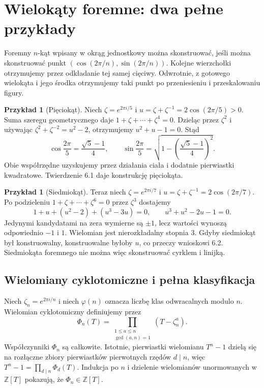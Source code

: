 \documentclass[11pt,a4paper,oneside]{book}
\numberwithin{equation}{section}
\theoremstyle{plain}
\theoremstyle{definition}
\newtheorem{przyklad}[twierdzenie]{Przykład}
\theoremstyle{remark}
\newcommand{\Z}{\mathbb{Z}}
\begin{document}
\section{Wielokąty foremne: dwa pełne przykłady}

Foremny $n$-kąt wpisany w okrąg jednostkowy można skonstruować, jeśli można skonstruować punkt $(\cos(2\pi/n),\sin(2\pi/n))$. Kolejne wierzchołki otrzymujemy przez odkładanie tej samej cięciwy. Odwrotnie, z gotowego wielokąta i jego środka otrzymujemy taki punkt po przeniesieniu i przeskalowaniu figury.

\begin{przyklad}[Pięciokąt]
Niech $\zeta=e^{2\pi i/5}$ i $u=\zeta+\zeta^{-1}=2\cos(2\pi/5)>0$. Suma szeregu geometrycznego daje $1+\zeta+\cdots+\zeta^4=0$. Dzieląc przez $\zeta^2$ i używając $\zeta^2+\zeta^{-2}=u^2-2$, otrzymujemy $u^2+u-1=0$. Stąd
\[
\cos\frac{2\pi}{5}=\frac{\sqrt5-1}{4},\qquad
\sin\frac{2\pi}{5}=\sqrt{1-\left(\frac{\sqrt5-1}{4}\right)^2}.
\]
Obie współrzędne uzyskujemy przez działania ciała i dodatnie pierwiastki kwadratowe. Twierdzenie 6.1 daje konstrukcję pięciokąta.
\end{przyklad}

\begin{przyklad}[Siedmiokąt]
Teraz niech $\zeta=e^{2\pi i/7}$ i $u=\zeta+\zeta^{-1}=2\cos(2\pi/7)$. Po podzieleniu $1+\zeta+\cdots+\zeta^6=0$ przez $\zeta^3$ dostajemy
\[
1+u+(u^2-2)+(u^3-3u)=0,\qquad u^3+u^2-2u-1=0.
\]
Jedynymi kandydatami na zera wymierne są $\pm1$, lecz wartości wynoszą odpowiednio $-1$ i $1$. Wielomian jest nierozkładalny stopnia $3$. Gdyby siedmiokąt był konstruowalny, konstruowalne byłoby $u$, co przeczy wnioskowi 6.2. Siedmiokąta foremnego nie można więc skonstruować cyrklem i linijką.
\end{przyklad}

\subsection*{Wielomiany cyklotomiczne i pełna klasyfikacja}

Niech $\zeta_n=e^{2\pi i/n}$ i niech $\varphi(n)$ oznacza liczbę klas odwracalnych modulo $n$. Wielomian cyklotomiczny definiujemy przez
\[
\Phi_n(T)=\prod_{\substack{1\le a\le n\\\gcd(a,n)=1}}(T-\zeta_n^a).
\]
Współczynniki $\Phi_n$ są całkowite. Istotnie, pierwiastki wielomianu $T^n-1$ dzielą się na rozłączne zbiory pierwiastków pierwotnych rzędów $d\mid n$, więc
$T^n-1=\prod_{d\mid n}\Phi_d(T)$. Indukcja po $n$ i dzielenie wielomianów unormowanych w $\Z[T]$ pokazują, że $\Phi_n\in\Z[T]$.
\end{document}
